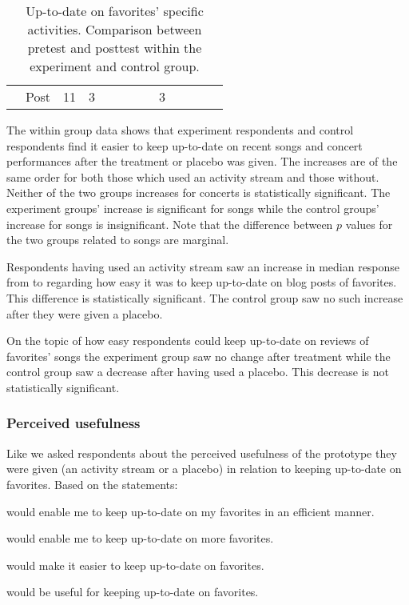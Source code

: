 \begin{table}
\begin{whole}
\begin{tabular}{rrrrccclrrrrl}
        &
        Post &
        11 &
        3 &
        &
        &
        &
        &
        3 \\

  \end{tabular}
  \caption[Up-to-date on Specific Activities, Within Groups]{%
    Up-to-date on favorites' specific activities. Comparison between
    pretest and posttest within the experiment and control group.
  }
  \label{table:up.to.date.favorite.specific.activities.within}
  \end{whole}
\end{table}

The within group data shows that experiment respondents and control
respondents find it easier to keep up-to-date on recent songs
and concert performances after the treatment or placebo was given.
The increases are of the same order for both those which used an
activity stream and those without. Neither of the two groups increases
for concerts is statistically significant.
The experiment groups' increase is significant for songs while the control
groups' increase for songs is insignificant.
Note that the difference between $p$ values for the two groups related to
songs are marginal.

Respondents having used an activity stream saw an increase in median
response from  to  regarding
how easy it was to keep up-to-date on blog posts of favorites.
This difference is statistically significant.
The control group saw no such increase after they were given a placebo.

On the topic of how easy respondents could keep up-to-date on
reviews of favorites' songs the experiment group saw no change
after treatment while the control group saw a decrease after having used
a placebo. This decrease is not statistically significant.

\subsubsection{Perceived usefulness}

Like \citet{davis89} we asked respondents about the perceived usefulness
of the prototype they were given (an activity stream or a placebo) in relation
to keeping up-to-date on favorites. Based on the statements:

\begin{items}
  \item \latest{} would enable me to keep up-to-date on my favorites in an
    efficient manner.
  \item \latest{} would enable me to keep up-to-date on more favorites.
  \item \latest{} would make it easier to keep up-to-date on favorites.
  \item \latest{} would be useful for keeping up-to-date on favorites.
\end{items}

